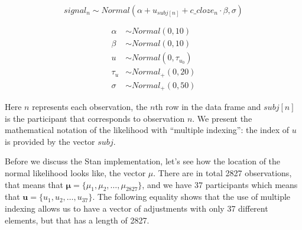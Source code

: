 \documentclass[12pt,]{krantz}
\theoremstyle{definition}
\theoremstyle{definition}
\theoremstyle{definition}
\theoremstyle{remark}
\begin{document}
\begin{equation}
  signal_n \sim Normal(\alpha + u_{subj[n]} + c\_cloze_n \cdot \beta,\sigma)
\end{equation}

\begin{equation}
 \begin{aligned}
 \alpha &\sim Normal(0,10)\\
 \beta  &\sim Normal(0,10)\\
 u &\sim Normal(0,\tau_{u_0})\\
 \tau_{u} &\sim Normal_+(0,20) \\
 \sigma  &\sim Normal_+(0,50)
 \end{aligned}
 \end{equation}

Here \(n\) represents each observation, the \(n\)th row in the data
frame and \(subj[n]\) is the participant that corresponds to observation
\(n\). We present the mathematical notation of the likelihood with
``multiple indexing'': the index of \(u\) is provided by the vector
\(subj\).

Before we discuss the Stan implementation, let's see how the location of
the normal likelihood looks like, the vector \(\mu\). There are in total
2827 observations, that means that
\(\boldsymbol{\mu}=\{\mu_1,\mu_2, \ldots, \mu_{2827}\}\), and we have 37
participants which means that
\(\boldsymbol{u}=\{u_1,u_2, \ldots, u_{37}\}\). The following equality
shows that the use of multiple indexing allows us to have a vector of
adjustments with only 37 different elements, but that has a length of
2827.
\end{document}
